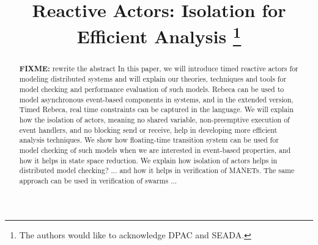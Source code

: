 \documentclass[conference]{IEEEtran}
\newcommand{\fixme}[1]{{\color{red}\textbf{FIXME:} #1}}
\begin{document}
	
	\title{%
	Reactive Actors: Isolation for Efficient Analysis 
		\thanks{The authors would like to acknowledge DPAC and SEADA.}
	}
	
	\author{
		\and
		\and
	}
	
	\maketitle
	
	\begin{abstract}
		\fixme{rewrite the abstract} In this paper, we will introduce timed reactive actors for modeling distributed systems and will explain our theories, techniques and tools for model checking and performance evaluation of such models.  Rebeca can be used to model asynchronous event-based components in systems, and in the extended version, Timed Rebeca, real time constraints can be captured in the language. We will explain how the isolation of actors, meaning no shared variable, non-preemptive execution of event handlers, and no blocking send or receive, help in developing more efficient analysis techniques. We show how floating-time transition system can be used for model checking of such models when we are interested in event-based properties, and how it helps in state space reduction. We explain how isolation of actors helps in distributed model checking? ... and how it helps in verification of MANETs. The same approach can be used in verification of swarms ...
		
	\end{abstract}
	
\end{document}
